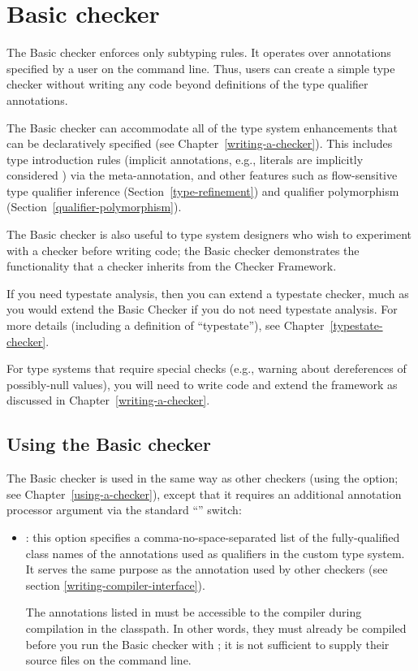 \htmlhr
\chapter{Basic checker\label{basic-checker}}

The Basic checker enforces only subtyping rules.  It operates over
annotations specified by a user on the command line.  Thus, users can
create a simple type checker without writing any code beyond definitions of
the type qualifier annotations.

The Basic checker can accommodate all of the type system enhancements that
can be declaratively specified (see Chapter~\ref{writing-a-checker}).
This includes type introduction rules (implicit
annotations, e.g., literals are implicitly considered ) via
the  meta-annotation, and other features such as
flow-sensitive type qualifier inference (Section~\ref{type-refinement}) and
qualifier polymorphism (Section~\ref{qualifier-polymorphism}).

The Basic checker is also useful to type system designers who wish to
experiment with a checker before writing code; the Basic checker
demonstrates the functionality that a checker inherits from the Checker
Framework.

If you need typestate analysis, then you can extend a typestate checker,
much as you would extend the Basic Checker if you do not need typestate
analysis.  For more details (including a definition of ``typestate''), see
Chapter~\ref{typestate-checker}.

For type systems that require special checks (e.g., warning about
dereferences of possibly-null values), you will need to write code and
extend the framework as discussed in Chapter~\ref{writing-a-checker}.


\section{Using the Basic checker\label{basic-using}}

The Basic checker is used in the same way as other checkers (using the
 option; see Chapter~\ref{using-a-checker}), except that it
requires an additional annotation processor argument via the standard
``'' switch:

\begin{itemize}

\item
{}: this option specifies a comma-no-space-separated list of
the fully-qualified class
names of the annotations used as qualifiers in the custom type system.
%
It serves the same purpose as the 
annotation used by other checkers (see section
\ref{writing-compiler-interface}).

The annotations listed in  must be accessible to
the compiler during compilation in the classpath.  In other words, they must
already be compiled before you run the Basic checker with ; it
is not sufficient to supply their source files on the command line.

\end{itemize}

